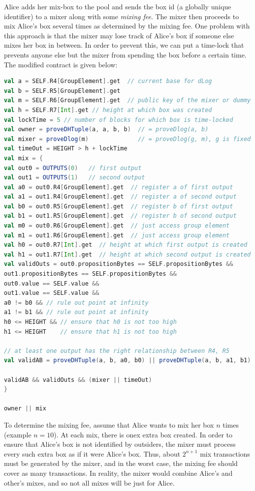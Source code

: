 \documentclass[runningheads]{llncs}
\begin{document}
Alice adds her mix-box to the pool and sends the box id (a globally unique identifier) to a mixer along with some {\em mixing fee}. The mixer then proceeds to mix Alice's box several times as determined by the mixing fee.
One problem with this approach is that the mixer may lose track of Alice's box if someone else mixes her box in between. In order to prevent this, we can put a time-lock that prevents anyone else but the mixer from spending the box before a certain time. The modified contract is given below:

\begin{lstlisting}[language=Scala,caption={Mix-script with Outsourceability},label=mixScript]
val a = SELF.R4[GroupElement].get  // current base for dLog
val b = SELF.R5[GroupElement].get
val m = SELF.R6[GroupElement].get  // public key of the mixer or dummy value
val h = SELF.R7[Int].get // height at which box was created
val lockTime = 5 // number of blocks for which box is time-locked
val owner = proveDHTuple(a, a, b, b)  // = proveDlog(a, b)
val mixer = proveDlog(m)              // = proveDlog(g, m), g is fixed
val timeOut = HEIGHT > h + lockTime
val mix = {
val out0 = OUTPUTS(0)   // first output
val out1 = OUTPUTS(1)   // second output
val a0 = out0.R4[GroupElement].get  // register a of first output
val a1 = out1.R4[GroupElement].get  // register a of second output
val b0 = out0.R5[GroupElement].get  // register b of first output
val b1 = out1.R5[GroupElement].get  // register b of second output
val m0 = out0.R6[GroupElement].get  // just access group element
val m1 = out1.R6[GroupElement].get  // just access group element
val h0 = out0.R7[Int].get  // height at which first output is created
val h1 = out1.R7[Int].get  // height at which second output is created
val validOuts = out0.propositionBytes == SELF.propositionBytes &&
out1.propositionBytes == SELF.propositionBytes &&
out0.value == SELF.value &&
out1.value == SELF.value &&
a0 != b0 && // rule out point at infinity
a1 != b1 && // rule out point at infinity
h0 <= HEIGHT && // ensure that h0 is not too high
h1 <= HEIGHT    // ensure that h1 is not too high

// at least one output has the right relationship between R4, R5
val validAB = proveDHTuple(a, b, a0, b0) || proveDHTuple(a, b, a1, b1)

validAB && validOuts && (mixer || timeOut)
}

owner || mix
\end{lstlisting}

To determine the mixing fee, assume that Alice wants to mix her box $n$ times (example $n = 10$). At each mix, there is onex extra box created. In order to ensure that Alice's box is not identified by outsiders, the mixer must process every such extra box as if it were Alice's box. Thus, about $2^{n+1}$ mix transactions must be generated by the mixer, and in the worst case, the mixing fee should cover as many transactions. In reality, the mixer would combine Alice's and other's mixes, and so not all mixes will be just for Alice.
\end{document}
